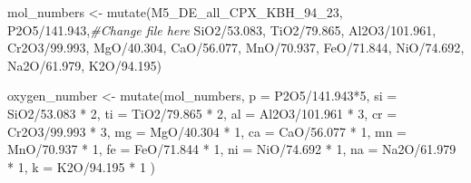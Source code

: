 \documentclass[
]{article}
\newenvironment{Shaded}{\begin{snugshade}}{\end{snugshade}}
\newcommand{\AttributeTok}[1]{\textcolor[rgb]{0.77,0.63,0.00}{#1}}
\newcommand{\CommentTok}[1]{\textcolor[rgb]{0.56,0.35,0.01}{\textit{#1}}}
\newcommand{\DecValTok}[1]{\textcolor[rgb]{0.00,0.00,0.81}{#1}}
\newcommand{\FloatTok}[1]{\textcolor[rgb]{0.00,0.00,0.81}{#1}}
\newcommand{\FunctionTok}[1]{\textcolor[rgb]{0.00,0.00,0.00}{#1}}
\newcommand{\NormalTok}[1]{#1}
\newcommand{\OtherTok}[1]{\textcolor[rgb]{0.56,0.35,0.01}{#1}}
\newcommand{\SpecialCharTok}[1]{\textcolor[rgb]{0.00,0.00,0.00}{#1}}
\begin{document}
\begin{Shaded}
\begin{Highlighting}[]
\NormalTok{mol\_numbers }\OtherTok{\textless{}{-}} \FunctionTok{mutate}\NormalTok{(M5\_DE\_all\_CPX\_KBH\_94\_23, P2O5}\SpecialCharTok{/}\FloatTok{141.943}\NormalTok{,}\CommentTok{\#Change file here}
\NormalTok{                  SiO2}\SpecialCharTok{/}\FloatTok{53.083}\NormalTok{,}
\NormalTok{                  TiO2}\SpecialCharTok{/}\FloatTok{79.865}\NormalTok{,}
\NormalTok{                  Al2O3}\SpecialCharTok{/}\FloatTok{101.961}\NormalTok{,}
\NormalTok{                  Cr2O3}\SpecialCharTok{/}\FloatTok{99.993}\NormalTok{,}
\NormalTok{                  MgO}\SpecialCharTok{/}\FloatTok{40.304}\NormalTok{,}
\NormalTok{                  CaO}\SpecialCharTok{/}\FloatTok{56.077}\NormalTok{,}
\NormalTok{                  MnO}\SpecialCharTok{/}\FloatTok{70.937}\NormalTok{,}
\NormalTok{                  FeO}\SpecialCharTok{/}\FloatTok{71.844}\NormalTok{,}
\NormalTok{                  NiO}\SpecialCharTok{/}\FloatTok{74.692}\NormalTok{,}
\NormalTok{                  Na2O}\SpecialCharTok{/}\FloatTok{61.979}\NormalTok{,}
\NormalTok{                  K2O}\SpecialCharTok{/}\FloatTok{94.195}\NormalTok{)}

\NormalTok{oxygen\_number }\OtherTok{\textless{}{-}} \FunctionTok{mutate}\NormalTok{(mol\_numbers, }\AttributeTok{p =}\NormalTok{ P2O5}\SpecialCharTok{/}\FloatTok{141.943}\SpecialCharTok{*}\DecValTok{5}\NormalTok{,}
                        \AttributeTok{si =}\NormalTok{ SiO2}\SpecialCharTok{/}\FloatTok{53.083} \SpecialCharTok{*} \DecValTok{2}\NormalTok{,}
                        \AttributeTok{ti =}\NormalTok{ TiO2}\SpecialCharTok{/}\FloatTok{79.865} \SpecialCharTok{*} \DecValTok{2}\NormalTok{,}
                        \AttributeTok{al =}\NormalTok{ Al2O3}\SpecialCharTok{/}\FloatTok{101.961} \SpecialCharTok{*} \DecValTok{3}\NormalTok{,}
                        \AttributeTok{cr =}\NormalTok{ Cr2O3}\SpecialCharTok{/}\FloatTok{99.993} \SpecialCharTok{*} \DecValTok{3}\NormalTok{,}
                        \AttributeTok{mg =}\NormalTok{ MgO}\SpecialCharTok{/}\FloatTok{40.304} \SpecialCharTok{*} \DecValTok{1}\NormalTok{,}
                        \AttributeTok{ca =}\NormalTok{ CaO}\SpecialCharTok{/}\FloatTok{56.077} \SpecialCharTok{*} \DecValTok{1}\NormalTok{,}
                        \AttributeTok{mn =}\NormalTok{ MnO}\SpecialCharTok{/}\FloatTok{70.937} \SpecialCharTok{*} \DecValTok{1}\NormalTok{,}
                        \AttributeTok{fe =}\NormalTok{ FeO}\SpecialCharTok{/}\FloatTok{71.844} \SpecialCharTok{*} \DecValTok{1}\NormalTok{,}
                        \AttributeTok{ni =}\NormalTok{ NiO}\SpecialCharTok{/}\FloatTok{74.692} \SpecialCharTok{*} \DecValTok{1}\NormalTok{,}
                        \AttributeTok{na =}\NormalTok{ Na2O}\SpecialCharTok{/}\FloatTok{61.979} \SpecialCharTok{*} \DecValTok{1}\NormalTok{,}
                        \AttributeTok{k =}\NormalTok{ K2O}\SpecialCharTok{/}\FloatTok{94.195} \SpecialCharTok{*} \DecValTok{1}
\NormalTok{                        )}


\end{Highlighting}
\end{Shaded}
\end{document}
